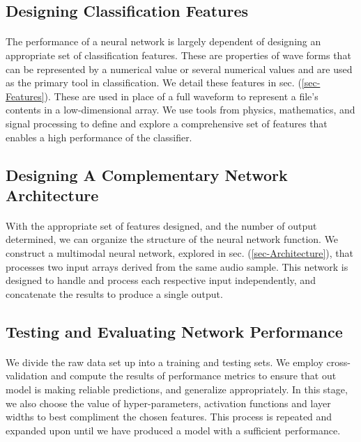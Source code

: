 \documentclass[12pt,letterpaper]{article}
\begin{document}

\subsection{Designing Classification Features}

\paragraph*{}The performance of a neural network is largely dependent of designing an appropriate set of classification features. These are properties of wave forms that can be represented by a numerical value or several numerical values and are used as the primary tool in classification. We detail these features in sec. (\ref{sec-Features}). These are used in place of a full waveform to represent a file's contents in a low-dimensional array. We use tools from physics, mathematics, and signal processing to define and explore a comprehensive set of features that enables a high performance of the classifier. 


\subsection{Designing A Complementary Network Architecture}

\paragraph*{}With the appropriate set of features designed, and the number of output determined, we can organize the structure of the neural network function. We construct a multimodal neural network, explored in sec. (\ref{sec-Architecture}), that processes two input arrays derived from the same audio sample. This network is designed to handle and process each respective input independently, and concatenate the results to produce a single output. 


\subsection{Testing and Evaluating Network Performance}

\paragraph*{}We divide the raw data set up into a training and testing sets. We employ cross-validation and compute the results of performance metrics to ensure that out model is making reliable predictions, and generalize appropriately. In this stage, we also choose the value of hyper-parameters, activation functions and layer widths to best compliment the chosen features. This process is repeated and expanded upon until we have produced a model with a sufficient performance.
\end{document}
